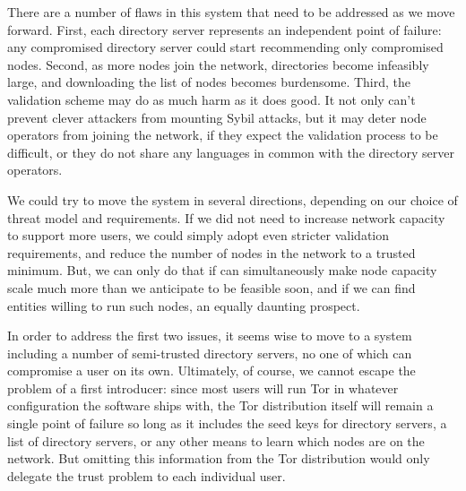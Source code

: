 \documentclass{llncs}
\begin{document}
There are a number of flaws in this system that need to be addressed as we
move forward. First,
each directory server represents an independent point of failure: any
compromised directory server could start recommending only compromised
nodes.
Second, as more nodes join the network, %
directories
become infeasibly large, and downloading the list of nodes becomes
burdensome.
Third, the validation scheme may do as much harm as it does good.  It not
only can't prevent clever attackers from mounting Sybil attacks,
but it may deter node operators from joining the network, if
they expect the validation process to be difficult, or they do not share
any languages in common with the directory server operators.

We could try to move the system in several directions, depending on our
choice of threat model and requirements.  If we did not need to increase
network capacity to support more users, we could simply
 adopt even stricter validation requirements, and reduce the number of
nodes in the network to a trusted minimum.  
But, we can only do that if can simultaneously make node capacity
scale much more than we anticipate to be feasible soon, and if we can find
entities willing to run such nodes, an equally daunting prospect.

In order to address the first two issues, it seems wise to move to a system
including a number of semi-trusted directory servers, no one of which can
compromise a user on its own.  Ultimately, of course, we cannot escape the
problem of a first introducer: since most users will run Tor in whatever
configuration the software ships with, the Tor distribution itself will
remain a single point of failure so long as it includes the seed
keys for directory servers, a list of directory servers, or any other means
to learn which nodes are on the network.  But omitting this information
from the Tor distribution would only delegate the trust problem to each
individual user. %

\end{document}
